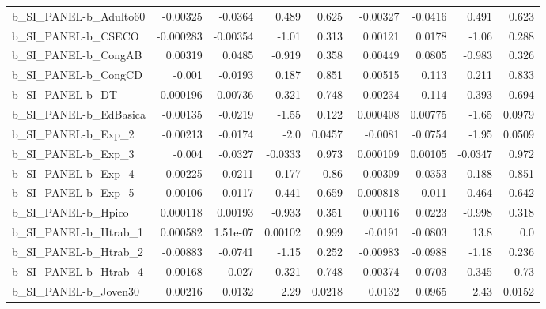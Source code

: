 \begin{tabular}{lrrrrrrrr}
b\_SI\_PANEL-b\_Adulto60      &    -0.00325 &      -0.0364 &    0.489 &    0.625 &   -0.00327 &     -0.0416 &        0.491 &         0.623 \\
b\_SI\_PANEL-b\_CSECO         &   -0.000283 &     -0.00354 &    -1.01 &    0.313 &    0.00121 &      0.0178 &        -1.06 &         0.288 \\
b\_SI\_PANEL-b\_CongAB        &     0.00319 &       0.0485 &   -0.919 &    0.358 &    0.00449 &      0.0805 &       -0.983 &         0.326 \\
b\_SI\_PANEL-b\_CongCD        &      -0.001 &      -0.0193 &    0.187 &    0.851 &    0.00515 &       0.113 &        0.211 &         0.833 \\
b\_SI\_PANEL-b\_DT            &   -0.000196 &     -0.00736 &   -0.321 &    0.748 &    0.00234 &       0.114 &       -0.393 &         0.694 \\
b\_SI\_PANEL-b\_EdBasica      &    -0.00135 &      -0.0219 &    -1.55 &    0.122 &   0.000408 &     0.00775 &        -1.65 &        0.0979 \\
b\_SI\_PANEL-b\_Exp\_2         &    -0.00213 &      -0.0174 &     -2.0 &   0.0457 &    -0.0081 &     -0.0754 &        -1.95 &        0.0509 \\
b\_SI\_PANEL-b\_Exp\_3         &      -0.004 &      -0.0327 &  -0.0333 &    0.973 &   0.000109 &     0.00105 &      -0.0347 &         0.972 \\
b\_SI\_PANEL-b\_Exp\_4         &     0.00225 &       0.0211 &   -0.177 &     0.86 &    0.00309 &      0.0353 &       -0.188 &         0.851 \\
b\_SI\_PANEL-b\_Exp\_5         &     0.00106 &       0.0117 &    0.441 &    0.659 &  -0.000818 &      -0.011 &        0.464 &         0.642 \\
b\_SI\_PANEL-b\_Hpico         &    0.000118 &      0.00193 &   -0.933 &    0.351 &    0.00116 &      0.0223 &       -0.998 &         0.318 \\
b\_SI\_PANEL-b\_Htrab\_1       &    0.000582 &     1.51e-07 &  0.00102 &    0.999 &    -0.0191 &     -0.0803 &         13.8 &           0.0 \\
b\_SI\_PANEL-b\_Htrab\_2       &    -0.00883 &      -0.0741 &    -1.15 &    0.252 &   -0.00983 &     -0.0988 &        -1.18 &         0.236 \\
b\_SI\_PANEL-b\_Htrab\_4       &     0.00168 &        0.027 &   -0.321 &    0.748 &    0.00374 &      0.0703 &       -0.345 &          0.73 \\
b\_SI\_PANEL-b\_Joven30       &     0.00216 &       0.0132 &     2.29 &   0.0218 &     0.0132 &      0.0965 &         2.43 &        0.0152 \\

\end{tabular}
